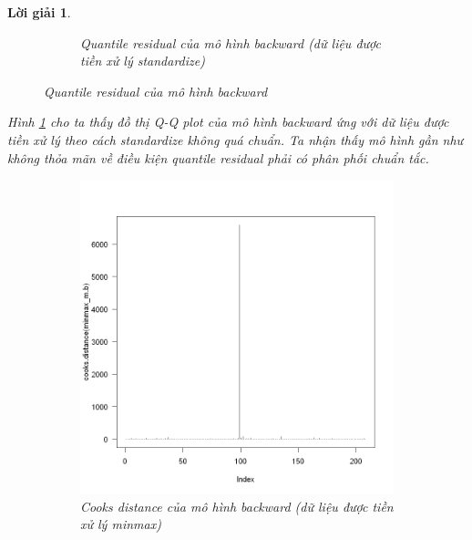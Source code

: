 \documentclass[14pt, a4paper]{article}
\theoremstyle{sltheorem}
\theoremstyle{soltheorem}
\newtheorem*{loigiai}{Lời giải}
\begin{document}
\begin{loigiai}
\begin{figure}[h!]
\begin{subfigure}[b]{0.4\textwidth}
            \caption{Quantile residual của mô hình backward (dữ liệu được tiền xử lý standardize)}
        \end{subfigure}
        \caption{Quantile residual của mô hình backward}
        \label{fig:Quantile-resid-mb}
    \end{figure}

    Hình \ref{fig:Quantile-resid-mb} cho ta thấy đồ thị Q-Q plot của mô hình backward ứng với dữ liệu được tiền xử lý theo cách standardize không quá chuẩn.
    Ta nhận thấy mô hình gần như không thỏa mãn về điều kiện quantile residual phải có phân phối chuẩn tắc.


    \begin{figure}[h!]
        \centering
        \begin{subfigure}[b]{0.4\textwidth}
            \centering
            \includegraphics[width=\textwidth]{figures/minmax_mb_cooks.png}
            \caption{Cooks distance của mô hình backward (dữ liệu được tiền xử lý minmax)}
        \end{subfigure}
        \hfill
        \begin{subfigure}[b]{0.4\textwidth}
            \centering

\end{subfigure}
\end{figure}
\end{loigiai}
\end{document}
